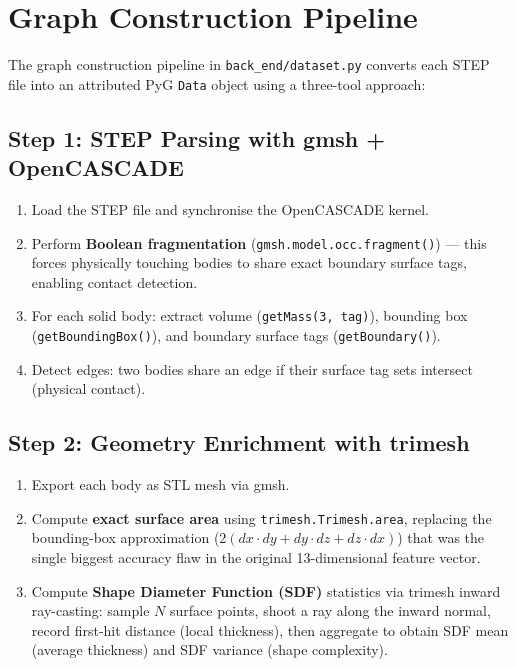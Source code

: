 \documentclass[12pt]{report}
\begin{document}
\section{Graph Construction Pipeline}

The graph construction pipeline in \texttt{back\_end/dataset.py} converts each STEP file into an attributed PyG \texttt{Data} object using a three-tool approach:

\subsection{Step 1: STEP Parsing with gmsh + OpenCASCADE}

\begin{enumerate}
    \item Load the STEP file and synchronise the OpenCASCADE kernel.
    \item Perform \textbf{Boolean fragmentation} (\texttt{gmsh.model.occ.fragment()}) --- this forces physically touching bodies to share exact boundary surface tags, enabling contact detection.
    \item For each solid body: extract volume (\texttt{getMass(3, tag)}), bounding box (\texttt{getBoundingBox()}), and boundary surface tags (\texttt{getBoundary()}).
    \item Detect edges: two bodies share an edge if their surface tag sets intersect (physical contact).
\end{enumerate}

\subsection{Step 2: Geometry Enrichment with trimesh}

\begin{enumerate}
    \item Export each body as STL mesh via gmsh.
    \item Compute \textbf{exact surface area} using \texttt{trimesh.Trimesh.area}, replacing the bounding-box approximation ($2(dx \cdot dy + dy \cdot dz + dz \cdot dx)$) that was the single biggest accuracy flaw in the original 13-dimensional feature vector.
    \item Compute \textbf{Shape Diameter Function (SDF)} statistics via trimesh inward ray-casting: sample $N$ surface points, shoot a ray along the inward normal, record first-hit distance (local thickness), then aggregate to obtain SDF mean (average thickness) and SDF variance (shape complexity).
\end{enumerate}
\end{document}
